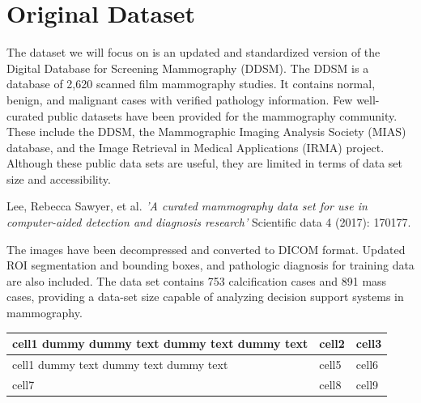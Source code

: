 \documentclass{book}
\begin{document}
    \section{Original Dataset}
        The dataset we will focus on is an updated and standardized version of the Digital Database for Screening Mammography (DDSM). The DDSM is a database of 2,620 scanned film mammography studies. It contains normal, benign, and malignant cases with verified pathology information. Few well-curated public datasets have been provided for the mammography community. These include the DDSM, the Mammographic Imaging Analysis Society (MIAS) database, and the Image Retrieval in Medical Applications (IRMA) project. Although these public data sets are useful, they are limited in terms of data set size and accessibility.

        \begin{center}
            \begin{minipage}{0.9\linewidth}
                \vspace{5pt}%
                {\small
                    Lee, Rebecca Sawyer, et al. \textit{'A curated mammography data set for use in computer-aided detection and diagnosis research'} Scientific data 4 (2017): 170177.
                }
                \vspace{5pt}%
            \end{minipage}
        \end{center}

        The images have been decompressed and converted to DICOM format. Updated ROI segmentation and bounding boxes, and pathologic diagnosis for training data are also included. The data set contains 753 calcification cases and 891 mass cases, providing a data-set size capable of analyzing decision support systems in mammography.

        
        \begin{center}
            \begin{tabular}{ | m{5em} | m{1cm}| m{1cm} | } 
            \hline
            cell1 dummy dummy text dummy text dummy text& cell2 & cell3 \\ 
            \hline
            cell1 dummy text dummy text dummy text & cell5 & cell6 \\ 
            \hline
            cell7 & cell8 & cell9 \\ 
            \hline
            \end{tabular}
        \end{center}
    
\end{document}
